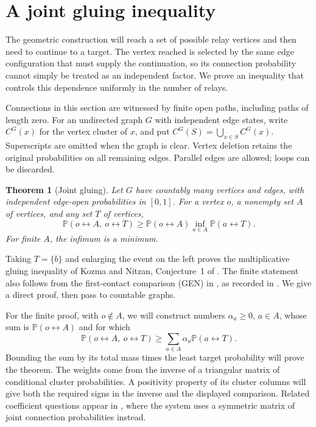 \documentclass[11pt]{article}
\newtheorem{theorem}{Theorem}[section]
\theoremstyle{definition}
\begin{document}
\section{A joint gluing inequality}
\label{sec:gluing}

The geometric construction will reach a set of possible relay vertices and
then need to continue to a target. The vertex reached is selected by the
same edge configuration that must supply the continuation, so its
connection probability cannot simply be treated as an independent factor.
We prove an inequality that controls this dependence uniformly in the
number of relays.

Connections in this section are witnessed by finite open paths, including
paths of length zero.  For an undirected graph $G$ with independent edge
states, write $C^G(x)$ for the vertex cluster of $x$, and put
$C^G(S)=\bigcup_{x\in S}C^G(x)$.  Superscripts are omitted when the graph
is clear.  Vertex deletion retains the original probabilities on all
remaining edges.  Parallel edges are allowed; loops can be discarded.

\begin{theorem}[Joint gluing]
\label{thm:joint-gluing}
Let $G$ have countably many vertices and edges, with independent edge-open
probabilities in $[0,1]$.  For a vertex $o$, a nonempty set $A$ of vertices,
and any set $T$ of vertices,
\begin{equation}
\label{eq:joint-gluing}
 \mathbb P(o\leftrightarrow A,\ o\leftrightarrow T)
 \ge \mathbb P(o\leftrightarrow A)
          \inf_{a\in A}\mathbb P(a\leftrightarrow T).
\end{equation}
For finite $A$, the infimum is a minimum.
\end{theorem}

Taking $T=\{b\}$ and enlarging the event on the left proves the
multiplicative gluing inequality of Kozma and Nitzan,
Conjecture~1 of \cite{KozmaNitzan2024}. The finite statement also follows
from the first-contact comparison (GEN) in \cite[Section~3.4]{Leder2026},
as recorded in \cite{ConnectionInequalities2026}. We give a direct proof,
then pass to countable graphs.

For the finite proof, with $o\notin A$, we will construct numbers
$\alpha_a\ge0$, $a\in A$, whose sum is $\mathbb P(o\leftrightarrow A)$
and for which
\[
 \mathbb P(o\leftrightarrow A,\ o\leftrightarrow T)
 \ge \sum_{a\in A}\alpha_a\mathbb P(a\leftrightarrow T).
\]
Bounding the sum by its total mass times the least target probability
will prove the theorem. The weights come from the inverse of a triangular
matrix of conditional cluster probabilities. A positivity property of
its cluster columns will give both the required signs in the inverse
and the displayed comparison. Related coefficient
questions appear in \cite[Section~5.2]{KozmaNitzan2024}, where the system
uses a symmetric matrix of joint connection probabilities instead.
\end{document}
